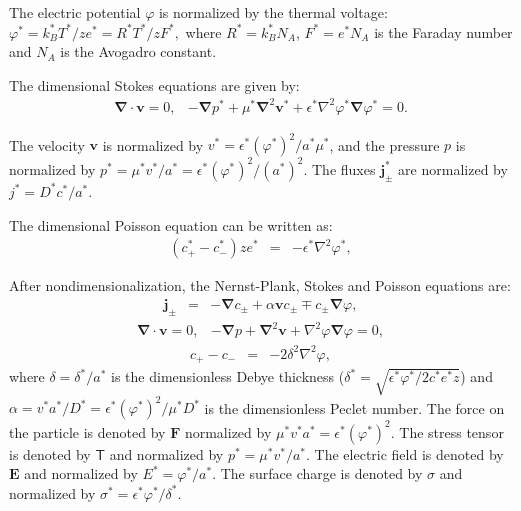 \documentclass[10pt]{ijnam}
\newcommand\eps \epsilon
\newcommand\Laplacian{\nabla^2}
\newcommand\bnabla{\boldsymbol{\nabla}}
\newcommand\bLaplacian{\boldsymbol{\nabla}^2}
\newcommand\bv{\boldsymbol{v}}
\newcommand\bE{\boldsymbol{E}}
\newcommand\bj{\boldsymbol{j}}
\newcommand\bF{\boldsymbol{F}}
\newcommand\tT{\mathsf{T}}
\begin{document}
The electric potential $\varphi$ is normalized by the thermal voltage:
$\varphi^* = {k_B^* T^*}/{z e^*} = {R^* T^*}/{z F^*},$
where $R^* = k_B^* N_A$, $F^* = e^* N_A$ is the Faraday number and $N_A$ is the Avogadro constant.

The dimensional Stokes equations are given by:
\begin{eqnarray}
\bnabla \cdot \bv = 0, &
-\bnabla p^* + \mu^* \bLaplacian \bv^* + \eps^* \Laplacian \varphi^* \bnabla \varphi^* = 0.
\end{eqnarray}

The velocity $\bv$ is normalized by $v^* = {\eps^* (\varphi^*)^2}/{a^* \mu^*}$,
and the pressure $p$ is normalized by $p^* = {\mu^* v^*}/{a^*} = {\eps^* (\varphi^*)^2}/{(a^*)^2}$.
The fluxes $\bj^*_\pm$ are normalized by $j^* = {D^* c^*}/{a^*}$.

The dimensional Poisson equation can be written as:
\begin{eqnarray}
(c^*_+ - c^*_-) z e^* &=& -\eps^* \Laplacian \varphi^*,
\end{eqnarray}

After nondimensionalization, the Nernst-Plank, Stokes and Poisson equations are:
\begin{eqnarray} \label{eq:nernst}
\bj_\pm &=& 
-\bnabla c_\pm + \alpha \bv c_\pm \mp c_\pm \bnabla \varphi,
\end{eqnarray}
\begin{eqnarray} \label{eq:stokes}
\bnabla \cdot \bv = 0, & -\bnabla p + \bLaplacian \bv + \Laplacian \varphi \bnabla \varphi = 0, 
\end{eqnarray}
\begin{eqnarray} \label{eq:poisson}
c_+ - c_- &=& -2\delta^2 \Laplacian \varphi,
\end{eqnarray}
where $\delta = {\delta^*}/{a^*}$ is the dimensionless Debye thickness 
($\delta^* = \sqrt{{\eps^* \varphi^*}/{2 c^* e^* z}}$) and 
$\alpha = {v^* a^*}/{D^*} = {\eps^* (\varphi^*)^2}/{\mu^* D^*}$ 
is the dimensionless Peclet number.
The force on the particle is denoted by $\bF$ normalized by $\mu^* v^* a^* = \eps^* (\varphi^*)^2$.
The stress tensor is denoted by $\tT$ and normalized by $p^* = \mu^* v^* / a^*$.
The electric field is denoted by $\bE$ and normalized by $E^* = \varphi^* / a^*$.
The surface charge is denoted by $\sigma$ and normalized by $\sigma^* = \eps^* \varphi^* / \delta^*$.
\end{document}
